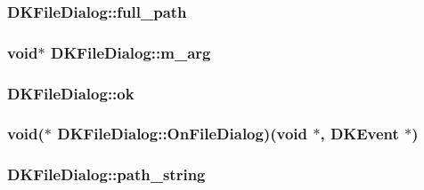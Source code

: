 \hypertarget{class_d_k_file_dialog_a9fd97e695f47289399f95322f19bd457}{
\subsubsection[{full\-\_\-path}]{ D\-K\-File\-Dialog\-::full\-\_\-path}}\label{class_d_k_file_dialog_a9fd97e695f47289399f95322f19bd457}
\hypertarget{class_d_k_file_dialog_a464acd6ab35aefc96d018cb2b78adf96}{
\subsubsection[{m\-\_\-arg}]{\setlength{\rightskip}{0pt plus 5cm}void$\ast$ D\-K\-File\-Dialog\-::m\-\_\-arg}}\label{class_d_k_file_dialog_a464acd6ab35aefc96d018cb2b78adf96}
\hypertarget{class_d_k_file_dialog_aaf1214e298f4f755e667fa59a2f5d3e5}{
\subsubsection[{ok}]{ D\-K\-File\-Dialog\-::ok}}\label{class_d_k_file_dialog_aaf1214e298f4f755e667fa59a2f5d3e5}
\hypertarget{class_d_k_file_dialog_ac32768df68e6cd883697ec2ee38e3aa1}{
\subsubsection[{On\-File\-Dialog}]{\setlength{\rightskip}{0pt plus 5cm}void($\ast$ D\-K\-File\-Dialog\-::\-On\-File\-Dialog)(void $\ast$, {\bf D\-K\-Event} $\ast$)}}\label{class_d_k_file_dialog_ac32768df68e6cd883697ec2ee38e3aa1}
\hypertarget{class_d_k_file_dialog_ab0539d16c59186286391d99c9195f6d2}{
\subsubsection[{path\-\_\-string}]{ D\-K\-File\-Dialog\-::path\-\_\-string}}\label{class_d_k_file_dialog_ab0539d16c59186286391d99c9195f6d2}
